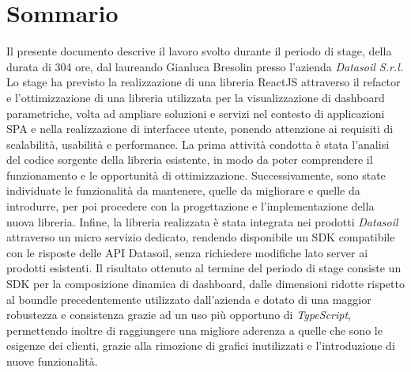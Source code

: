 \cleardoublepage
{}
{}
\begingroup
\let\clearpage\relax
\let\cleardoublepage\relax
\chapter*{Sommario}

Il presente documento descrive il lavoro svolto durante il periodo di stage, della durata di 304 ore, dal laureando Gianluca Bresolin
presso l'azienda \textit{Datasoil S.r.l.} Lo stage ha previsto la realizzazione di una libreria ReactJS attraverso il refactor
e l'ottimizzazione di una libreria utilizzata per la visualizzazione di dashboard parametriche, volta ad ampliare soluzioni e servizi
nel contesto di applicazioni SPA e nella realizzazione di interfacce utente, ponendo attenzione ai requisiti di scalabilità,
usabilità e performance. \newline
La prima attività condotta è stata l'analisi del codice sorgente della libreria esistente, in modo da poter comprendere il funzionamento e le opportunità
di ottimizzazione. Successivamente, sono state individuate le funzionalità da mantenere, quelle da migliorare e quelle da introdurre,
per poi procedere con la progettazione e l'implementazione della nuova libreria. \newline
Infine, la libreria realizzata è stata integrata nei prodotti \textit{Datasoil} attraverso un micro servizio dedicato, rendendo disponibile un SDK
compatibile con le risposte delle API Datasoil, senza richiedere modifiche lato server ai prodotti esistenti. \newline
Il risultato ottenuto al termine del periodo di stage consiste un SDK per la composizione dinamica di dashboard, dalle dimensioni ridotte rispetto
al boundle precedentemente utilizzato dall'azienda e dotato di una maggior robustezza e consistenza grazie ad un uso più opportuno di \textit{TypeScript},
permettendo inoltre di raggiungere una migliore aderenza a quelle che sono le esigenze dei clienti, grazie alla rimozione di grafici inutilizzati e
l'introduzione di nuove funzionalità.


\endgroup
\vfill

